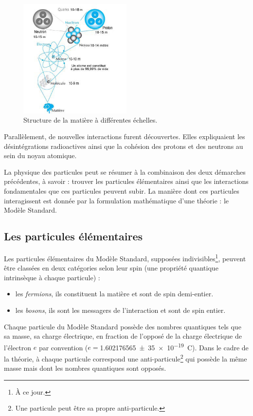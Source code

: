 \vspace*{-0.5cm}
\begin{figure}[ht!]
\centering
\includegraphics[width=0.50\textwidth]{SM/structure.jpg}
\captionsetup{type=figure}\caption{Structure de la matière à différentes échelles.}
\label{structure}
\end{figure}

\vspace*{-0.5cm}
Parallèlement, de nouvelles interactions furent découvertes. Elles expliquaient les désintégrations radioactives ainsi que la cohésion des protons et des neutrons au sein du noyau atomique.

La physique des particules peut se résumer à la combinaison des deux démarches précédentes, à savoir : trouver les particules élémentaires ainsi que les interactions fondamentales que ces particules peuvent subir. La manière dont ces particules interagissent est donnée par la formulation mathématique d'une théorie : le Modèle Standard.

\subsection{Les particules élémentaires}
Les particules élémentaires du Modèle Standard, supposées indivisibles\footnote{À ce jour.}, peuvent être classées en deux catégories selon leur spin (une propriété quantique intrinsèque à chaque particule) :
\begin{itemize}[label=$\bullet$]
\item les \textit{fermions}, ils constituent la matière et sont de spin demi-entier.
\item les \textit{bosons}, ils sont les messagers de l'interaction et sont de spin entier.
\end{itemize}
Chaque particule du Modèle Standard possède des nombres quantiques tels que sa masse, sa charge électrique, en fraction de l'opposé de la charge électrique de l'électron $e$ par convention ($e=$\SI{1.602 176 565(35)e-19}{\coulomb}). Dans le cadre de la théorie, à chaque particule correspond une anti-particule\footnote{Une particule peut être sa propre anti-particule.} qui possède la même masse mais dont les nombres quantiques sont opposés.


